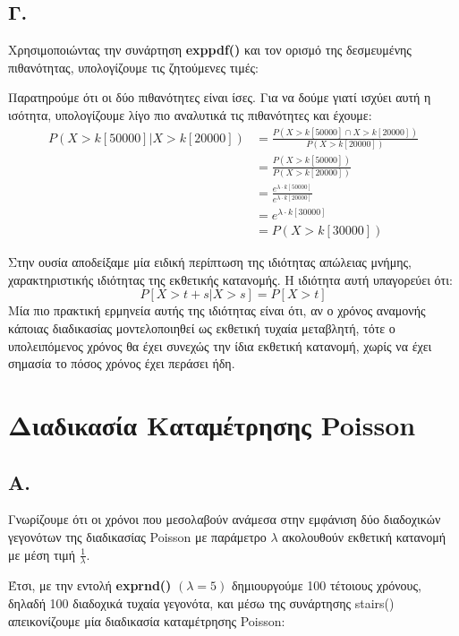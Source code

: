 \documentclass[a4paper]{article}
\begin{document}
\subsection*{Γ.}

Χρησιμοποιώντας την συνάρτηση \textbf{exppdf()} και τον ορισμό της δεσμευμένης πιθανότητας, υπολογίζουμε τις ζητούμενες τιμές:



Παρατηρούμε ότι οι δύο πιθανότητες είναι ίσες. 
Για να δούμε γιατί ισχύει αυτή η ισότητα, υπολογίζουμε λίγο πιο αναλυτικά τις πιθανότητες και έχουμε: 
\begin{align*}
	P(X>k[50000]|X>k[20000]) &= \frac{P(X>k[50000] \cap X>k[20000])}{P(X>k[20000])} \\
							 &= \frac{P(X>k[50000])}{P(X>k[20000])} \\
							 &= \frac{e^{λ \cdot k[50000]}}{e^{λ \cdot k[20000]}} \\
							 &= e^{λ \cdot k[30000]} \\
							 &= P(X>k [30000])
\end{align*}

Στην ουσία αποδείξαμε μία ειδική περίπτωση της ιδιότητας απώλειας μνήμης, χαρακτηριστικής ιδιότητας της εκθετικής κατανομής. Η ιδιότητα αυτή υπαγορεύει ότι:
\[
	P[X>t+s|X>s] = P[X>t]
\]
Μία πιο πρακτική ερμηνεία αυτής της ιδιότητας είναι ότι, αν ο χρόνος αναμονής κάποιας διαδικασίας μοντελοποιηθεί ως εκθετική τυχαία μεταβλητή, τότε ο υπολειπόμενος χρόνος θα έχει συνεχώς την ίδια εκθετική κατανομή, χωρίς να έχει σημασία το πόσος χρόνος έχει περάσει ήδη.

\section*{Διαδικασία Καταμέτρησης Poisson}

\subsection*{Α.}

Γνωρίζουμε ότι οι χρόνοι που μεσολαβούν ανάμεσα στην εμφάνιση δύο διαδοχικών γεγονότων της διαδικασίας Poisson με παράμετρο $ λ $ ακολουθούν εκθετική κατανομή με μέση τιμή $ \frac{1}{λ} $.

Έτσι, με την εντολή \textbf{exprnd()} $ (λ = 5) $ δημιουργούμε 100 τέτοιους χρόνους, δηλαδή 100 διαδοχικά τυχαία γεγονότα, και μέσω της συνάρτησης stairs() απεικονίζουμε μία διαδικασία καταμέτρησης Poisson:
\end{document}
